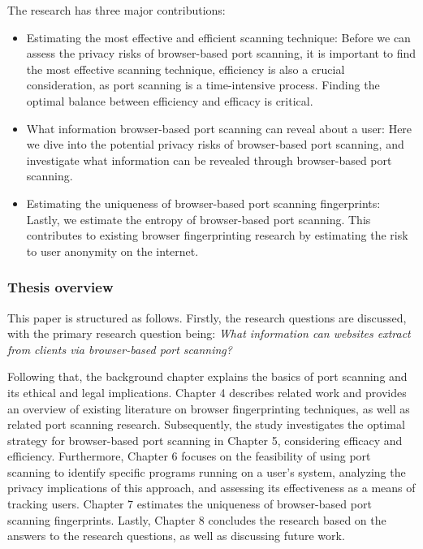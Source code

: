 The research has three major contributions:
\begin{itemize}
    \item Estimating the most effective and efficient scanning technique: Before we can assess the privacy risks of browser-based port scanning, it is important to find the most effective scanning technique, efficiency is also a crucial consideration, as port scanning is a time-intensive process. Finding the optimal balance between efficiency and efficacy is critical.
    \item What information browser-based port scanning can reveal about a user: Here we dive into the potential privacy risks of browser-based port scanning, and investigate what information can be revealed through browser-based port scanning.
    \item Estimating the uniqueness of browser-based port scanning fingerprints: Lastly, we estimate the entropy of browser-based port scanning. This contributes to existing browser fingerprinting research by estimating the risk to user anonymity on the internet. 
\end{itemize}

\subsubsection{Thesis overview}

This paper is structured as follows. Firstly, the research questions are discussed, with the primary research question being: \emph{What information can websites extract from clients via browser-based port scanning?} 

Following that, the background chapter explains the basics of port scanning and its ethical and legal implications. Chapter 4 describes related work and  provides an overview of existing literature on browser fingerprinting techniques, as well as related port scanning research.
Subsequently, the study investigates the optimal strategy for browser-based port scanning in Chapter 5, considering efficacy and efficiency. Furthermore, Chapter 6 focuses on the feasibility of using port scanning to identify specific programs running on a user's system, analyzing the privacy implications of this approach, and assessing its effectiveness as a means of tracking users. 
Chapter 7 estimates the uniqueness of browser-based port scanning fingerprints.
Lastly, Chapter 8 concludes the research based on the answers to the research questions, as well as discussing future work.